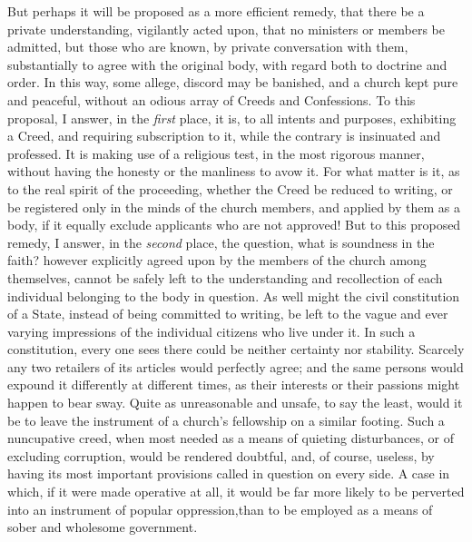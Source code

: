 \documentclass[
]{book}
\begin{document}
But perhaps it will be proposed as a more efficient remedy, that there be a private understanding, vigilantly acted upon, that no ministers or members be admitted, but those who are known, by private conversation with them, substantially to agree with the original body, with regard both to doctrine and order. In this way, some allege, discord may be banished, and a church kept pure and peaceful, without an odious array of Creeds and Confessions. To this proposal, I answer, in the \emph{first} place, it is, to all intents and purposes, exhibiting a Creed, and requiring subscription to it, while the contrary is insinuated and professed. It is making use of a religious test, in the most rigorous manner, without having the honesty or the manliness to avow it. For what matter is it, as to the real spirit of the proceeding, whether the Creed be reduced to writing, or be registered only in the minds of the church members, and applied by them as a body, if it equally exclude applicants who are not approved! But to this proposed remedy, I answer, in the \emph{second} place, the question, what is soundness in the faith? however explicitly agreed upon by the members of the church among themselves, cannot be safely left to the understanding and recollection of each individual belonging to the body in question. As well might the civil constitution of a State, instead of being committed to writing, be left to the vague and ever varying impressions of the individual citizens who live under it. In such a constitution, every one sees there could be neither certainty nor stability. Scarcely any two retailers of its articles would perfectly agree; and the same persons would expound it differently at different times, as their interests or their passions might happen to bear sway. Quite as unreasonable and unsafe, to say the least, would it be to leave the instrument of a church's fellowship on a similar footing. Such a nuncupative creed, when most needed as a means of quieting disturbances, or of excluding corruption, would be rendered doubtful, and, of course, useless, by having its most important provisions called in question on every side. A case in which, if it were made operative at all, it would be far more likely to be perverted into an instrument of popular oppression,than to be employed as a means of sober and wholesome government.
\end{document}
